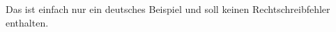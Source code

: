 \documentclass[a4paper,11pt,twoside]{scrartcl}
\begin{document}
Das ist einfach nur ein deutsches Beispiel und soll keinen Rechtschreibfehler enthalten.
\end{document}
